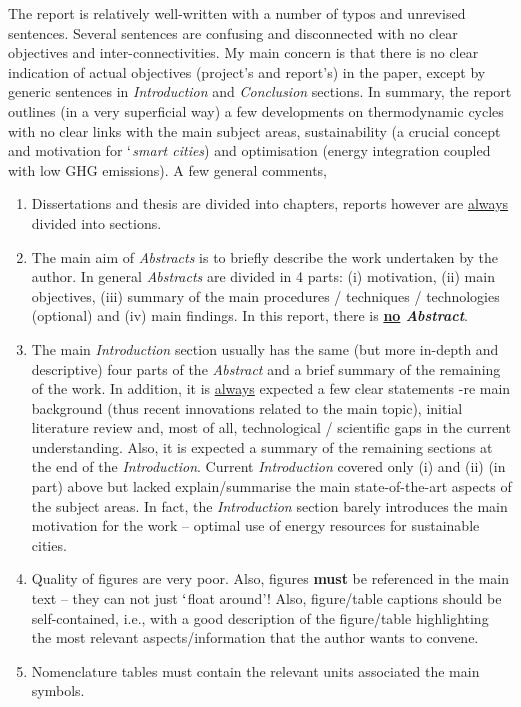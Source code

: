 \documentclass[14pt,twoside]{report}
\begin{document}
The report is relatively well-written with a number of typos and unrevised sentences. Several sentences are confusing and disconnected with no clear objectives and inter-connectivities. My main concern is that there is no clear indication of actual objectives (project's and report's) in the paper, except by generic sentences in {\it Introduction} and {\it Conclusion} sections. In summary, the report outlines (in a very superficial way) a few developments on thermodynamic cycles with no clear links with the main subject areas, sustainability (a crucial concept and motivation for $\lq${\it smart cities}) and optimisation (energy integration coupled with low GHG emissions). A few general comments,
\begin{enumerate}
%
\item Dissertations and thesis are divided into chapters, reports however are \underline{always} divided into sections. 
%
\item The main aim of {\it Abstracts} is to briefly describe the work undertaken by the author. In general {\it Abstracts} are divided in 4 parts: (i) motivation, (ii) main objectives, (iii) summary of the main procedures / techniques / technologies (optional) and (iv) main findings. In this report, there is {\bf\underline{no} {\it Abstract}}. 
%
\item The main {\it Introduction} section usually has the same (but more in-depth and descriptive) four parts of the {\it Abstract} and a brief summary of the remaining of the work. In addition, it is \underline{always} expected a few clear statements -re main background (thus recent innovations related to the main topic), initial literature review and, most of all, technological / scientific gaps in the current understanding. Also, it is expected a summary of the remaining sections at the end of the {\it Introduction}.  Current {\it Introduction} covered only (i) and (ii) (in part) above but lacked explain/summarise the main state-of-the-art aspects of the subject areas. In fact, the {\it Introduction} section barely introduces the main motivation for the work -- optimal use of energy resources for sustainable cities. 
%
\item Quality of figures are very poor. Also, figures {\bf must} be referenced in the main text -- they can not just $\lq$float around'! Also, figure/table captions should be self-contained, i.e., with a good description of the figure/table highlighting the most relevant aspects/information that the author wants to convene. 
%
\item Nomenclature tables must contain the relevant units associated the main symbols.


\end{enumerate}
\end{document}
